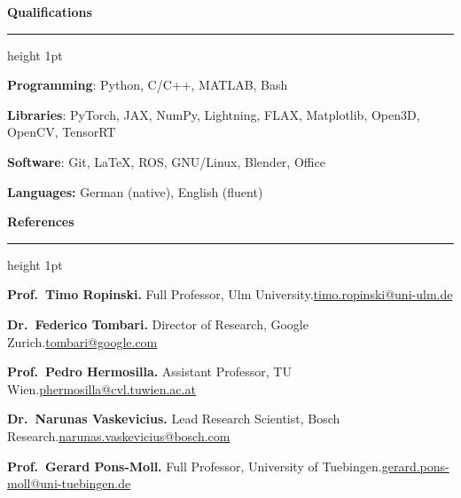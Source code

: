 \documentclass{article}
\newcommand{\cvsection}[2][14pt]{%
  \par\vspace{#1}%
  {\noindent\fontsize{11}{13.2}\selectfont\bfseries #2\par}%
  \vspace{2pt}\hrule height 1pt
  \vspace{5pt}}
\begin{document}
\cvsection[10pt]{Qualifications}

\begingroup\fontsize{10.5}{13.6}\selectfont
\textbf{Programming}: Python, C/C++, MATLAB, Bash\par
\textbf{Libraries}: PyTorch, JAX, NumPy, Lightning, FLAX, Matplotlib, Open3D, OpenCV, TensorRT\par
\textbf{Software}: Git, \LaTeX, ROS, GNU/Linux, Blender, Office\par
\textbf{Languages:} German (native), English (fluent)\par
\endgroup

\cvsection[9pt]{References}
\vspace{3pt}

\newcommand{\reference}[3]{\noindent\textbf{#1.} #2\hfill\href{mailto:#3}{#3}\par}
\begingroup\fontsize{10.5}{13.6}\selectfont
\reference{Prof.\ Timo Ropinski}{Full Professor, Ulm University.}{timo.ropinski@uni-ulm.de}
\reference{Dr.\ Federico Tombari}{Director of Research, Google Zurich.}{tombari@google.com}
\reference{Prof.\ Pedro Hermosilla}{Assistant Professor, TU Wien.}{phermosilla@cvl.tuwien.ac.at}
\reference{Dr.\ Narunas Vaskevicius}{Lead Research Scientist, Bosch Research.}{narunas.vaskevicius@bosch.com}
\reference{Prof.\ Gerard Pons-Moll}{Full Professor, University of Tuebingen.}{gerard.pons-moll@uni-tuebingen.de}
\endgroup
\end{document}
